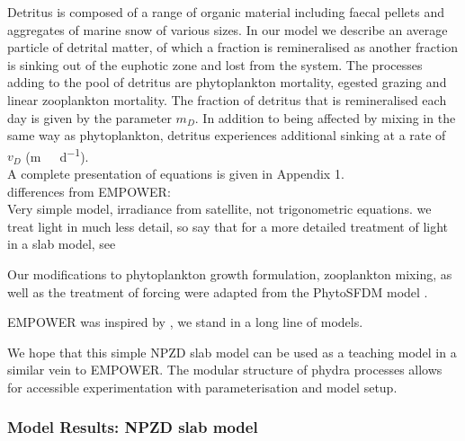 \documentclass[journal abbreviation, manuscript]{copernicus}
\begin{document}
Detritus is composed of a range of organic material including faecal pellets and aggregates of marine snow of various sizes. In our model we describe an average particle of detrital matter, of which a fraction is remineralised as another fraction is sinking out of the euphotic zone and lost from the system. The processes adding to the pool of detritus are phytoplankton mortality, egested grazing and linear zooplankton mortality. The fraction of detritus that is remineralised each day is given by the parameter $m_D$. In addition to being affected by mixing in the same way as phytoplankton, detritus experiences additional sinking at a rate of $v_D$ (\unit{m \ d^{-1}}).\\

A complete presentation of equations is given in Appendix 1.\\

differences from EMPOWER: \\
Very simple model,
irradiance from satellite, not trigonometric equations. we treat light in much less detail, so say that for a more detailed treatment of light in a slab model, see \cite{Anderson2015c}

Our modifications to phytoplankton growth formulation, zooplankton mixing, as well as the treatment of forcing were adapted from the PhytoSFDM model \cite{Acevedo-Trejos2016}.

EMPOWER was inspired by \cite{Fasham1990a}, we stand in a long line of models. 

We hope that this simple NPZD slab model can be used as a teaching model in a similar vein to EMPOWER. The modular structure of phydra processes allows for accessible experimentation with parameterisation and model setup. 



\subsubsection{Model Results: NPZD slab model}
\end{document}
